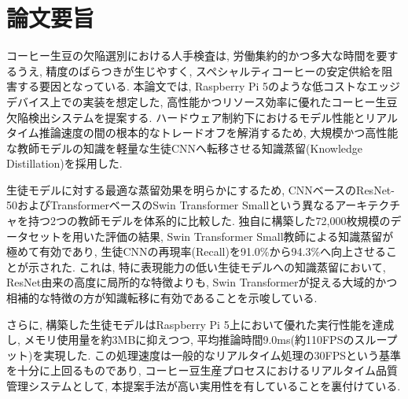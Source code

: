 \chapter*{論文要旨}
コーヒー生豆の欠陥選別における人手検査は, 労働集約的かつ多大な時間を要するうえ, 精度のばらつきが生じやすく, スペシャルティコーヒーの安定供給を阻害する要因となっている. 
本論文では, Raspberry Pi 5のような低コストなエッジデバイス上での実装を想定した, 高性能かつリソース効率に優れたコーヒー生豆欠陥検出システムを提案する. 
ハードウェア制約下におけるモデル性能とリアルタイム推論速度の間の根本的なトレードオフを解消するため, 大規模かつ高性能な教師モデルの知識を軽量な生徒CNNへ転移させる知識蒸留(Knowledge Distillation)を採用した.

生徒モデルに対する最適な蒸留効果を明らかにするため, CNNベースのResNet-50およびTransformerベースのSwin Transformer Smallという異なるアーキテクチャを持つ2つの教師モデルを体系的に比較した. 
独自に構築した72,000枚規模のデータセットを用いた評価の結果, Swin Transformer Small教師による知識蒸留が極めて有効であり, 生徒CNNの再現率(Recall)を91.0\%から94.3\%へ向上させることが示された. 
これは, 特に表現能力の低い生徒モデルへの知識蒸留において, ResNet由来の高度に局所的な特徴よりも, Swin Transformerが捉える大域的かつ相補的な特徴の方が知識転移に有効であることを示唆している.

さらに, 構築した生徒モデルはRaspberry Pi 5上において優れた実行性能を達成し, メモリ使用量を約3MBに抑えつつ, 平均推論時間9.0ms(約110FPSのスループット)を実現した. 
この処理速度は一般的なリアルタイム処理の30FPSという基準を十分に上回るものであり, コーヒー豆生産プロセスにおけるリアルタイム品質管理システムとして, 本提案手法が高い実用性を有していることを裏付けている.